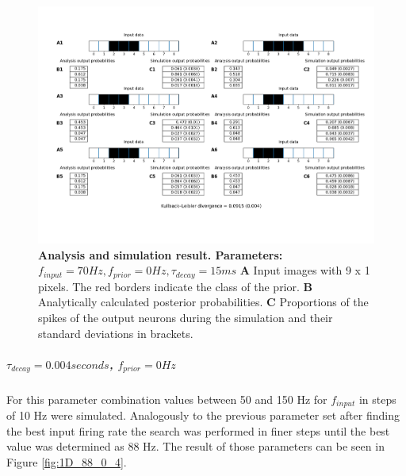 \begin{figure}
  \includegraphics[width=\linewidth]{figures/1D/1D_70_0_15.png}
  \caption{\textbf{Analysis and simulation result. Parameters: }$f_{input} = 70 Hz, f_{prior} = 0 Hz, \tau_{decay} = 15 ms$ \textbf{A} Input images with 9 x 1 pixels. The red borders indicate the class of the prior. \textbf{B} Analytically calculated posterior probabilities. \textbf{C} Proportions of the spikes of the output neurons during the simulation and their standard deviations in brackets.}
  \label{fig:1D_70_0_15}
\end{figure}

\subparagraph{$\tau_{decay} = 0.004 seconds$, $f_{prior} = 0 Hz$}
For this parameter combination values between 50 and 150 Hz for $f_{input}$ in steps of 10 Hz were simulated. Analogously to the previous parameter set after finding the best input firing rate the search was performed in finer steps until the best value was determined as 88 Hz. The result of those parameters can be seen in Figure \ref{fig:1D_88_0_4}.

